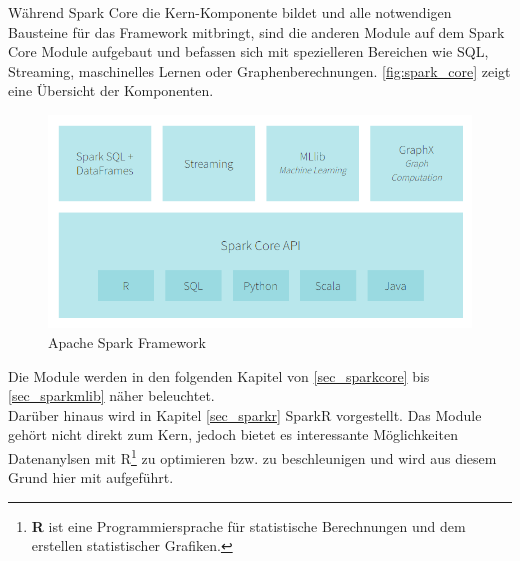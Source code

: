\noindent
Während Spark Core die Kern-Komponente bildet und alle notwendigen Bausteine für das Framework mitbringt, sind die anderen Module auf dem Spark Core Module aufgebaut und befassen sich mit spezielleren Bereichen wie SQL, Streaming, maschinelles Lernen oder Graphenberechnungen. \autoref{fig:spark_core} zeigt eine Übersicht der Komponenten. \\

\begin{figure}[h]
  \centering
  \includegraphics[width=\textwidth]{./bilder/spark_core.png}
  \caption{Apache Spark Framework}\label{fig:spark_core}
\end{figure}


\noindent
Die Module werden in den folgenden Kapitel von \ref{sec_sparkcore} bis \ref{sec_sparkmlib} näher beleuchtet. \\

\noindent
Darüber hinaus wird in Kapitel \ref{sec_sparkr} SparkR vorgestellt. Das Module gehört nicht direkt zum Kern, jedoch bietet es interessante Möglichkeiten Datenanylsen mit R\footnote{\textbf{R} ist eine Programmiersprache für statistische Berechnungen und dem erstellen statistischer Grafiken. } zu optimieren bzw. zu beschleunigen und wird aus diesem Grund hier mit aufgeführt.











\newpage
